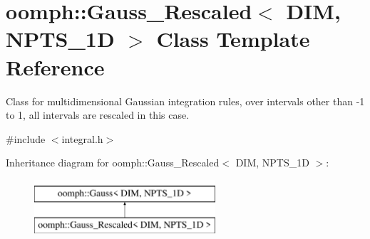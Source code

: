 \hypertarget{classoomph_1_1Gauss__Rescaled}{}\section{oomph\+:\+:Gauss\+\_\+\+Rescaled$<$ D\+IM, N\+P\+T\+S\+\_\+1D $>$ Class Template Reference}
\label{classoomph_1_1Gauss__Rescaled}


Class for multidimensional Gaussian integration rules, over intervals other than -\/1 to 1, all intervals are rescaled in this case.  




{\ttfamily \#include $<$integral.\+h$>$}

Inheritance diagram for oomph\+:\+:Gauss\+\_\+\+Rescaled$<$ D\+IM, N\+P\+T\+S\+\_\+1D $>$\+:\begin{figure}[H]
\begin{center}
\leavevmode
\includegraphics[height=2.000000cm]{classoomph_1_1Gauss__Rescaled}
\end{center}
\end{figure}
